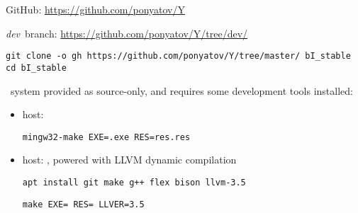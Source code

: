 \label{install}

GitHub: \url{https://github.com/ponyatov/Y}

\emph{dev}\ branch: \url{https://github.com/ponyatov/Y/tree/dev/}

\begin{verbatim}
git clone -o gh https://github.com/ponyatov/Y/tree/master/ bI_stable
cd bI_stable
\end{verbatim}

\bi\ system provided as source-only,
and requires some development tools installed:

\begin{itemize}
\item host: \win
{}
\begin{verbatim}
mingw32-make EXE=.exe RES=res.res
\end{verbatim}
\item host: \lin, powered with LLVM dynamic compilation
\begin{verbatim}
apt install git make g++ flex bison llvm-3.5
\end{verbatim}
\begin{verbatim}
make EXE= RES= LLVER=3.5
\end{verbatim}
\end{itemize}